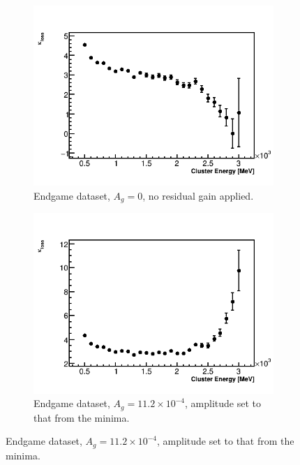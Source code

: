 \begin{landscape}
\begin{figure}[h]
    \begin{subfigure}[t]{0.4\textwidth}
        \centering
        \includegraphics[width=\textwidth]{TMethod_kappa_loss_Vs_EBin_Canv_EG-0}
        \caption{Endgame dataset, $A_{g} = 0$, no residual gain applied.}
    \end{subfigure}%
    \hspace{1cm}
    \begin{subfigure}[t]{0.4\textwidth}
        \centering
        \includegraphics[width=\textwidth]{TMethod_kappa_loss_Vs_EBin_Canv_EG-11p2}
        \caption{Endgame dataset, $A_{g} = 11.2 \times 10^{-4}$, amplitude set to that from the \chisq minima.}
    \end{subfigure}

\end{figure}
\end{landscape}
